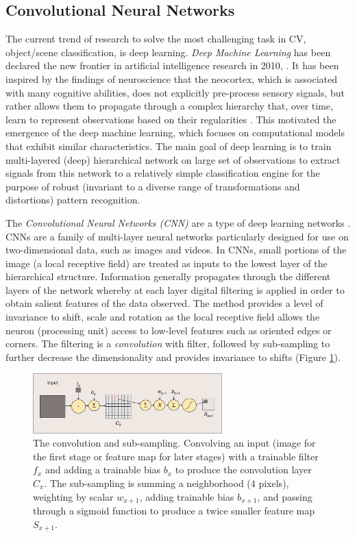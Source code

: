 \subsection{Convolutional Neural Networks}

The current trend of research to solve the most challenging task in CV, object/scene classification, is deep learning. {\em Deep Machine Learning} has been declared the new frontier in artificial intelligence research in 2010, \cite{Arel:2010}. It has been inspired by the findings of neuroscience that the neocortex, which is associated with many cognitive abilities, does not explicitly pre-process sensory signals, but rather allows them to propagate through a complex hierarchy that, over time, learn to represent observations based on their regularities \cite{Lee1998,Lee03}. This  motivated the emergence of the deep machine learning, which focuses on computational models that exhibit similar characteristics. The main goal of deep learning is to train multi-layered (deep) hierarchical network on large set of observations to extract signals from this network to a relatively simple classification engine for the purpose of robust (invariant to a diverse range of transformations and distortions) pattern recognition.

The {\em Convolutional Neural Networks (CNN)} are a type of deep learning networks \cite{Bengio:2009}. CNNs are a family of multi-layer neural networks particularly designed for use on two-dimensional data, such as images and videos. In CNNs, small portions of the image (a local receptive field) are treated as inputs to the lowest layer of the hierarchical structure. Information generally propagates
through the different layers of the network whereby at each layer digital filtering is applied in order to obtain salient features of the data observed. The method provides a level of invariance to
shift, scale and rotation as the local receptive field allows the neuron (processing unit) access to low-level features such as oriented edges or corners. The filtering is a {\em convolution} with filter, followed by sub-sampling to further decrease the dimensionality and provides invariance to shifts (Figure \ref{fig:conv}).

\begin{figure}[H]
\begin{center}
\includegraphics[width=0.65\textwidth]{fig/Conv}
\end{center}
\caption{The convolution and sub-sampling. Convolving an input (image for the first stage or feature map for later stages) with a trainable filter $f_x$ and adding a trainable bias $b_x$
to produce the convolution layer $C_x$. The sub-sampling is summing a neighborhood ($4$ pixels), weighting by scalar $w_{x+1}$, adding trainable bias $b_{x+1}$, and
passing through a sigmoid function to produce a twice smaller feature map $S_{x+1}$.}
\label{fig:conv}
\end{figure}

